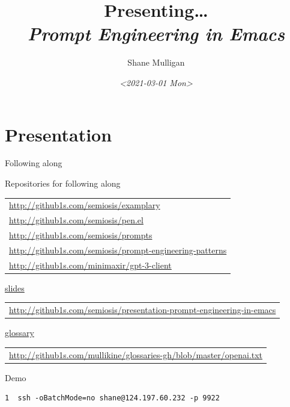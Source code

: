 \documentclass[presentation]{beamer}
\author{Shane Mulligan \\  }
\date{\textit{<2021-03-01 Mon>}}
\title{Presenting\ldots{} \\   \emph{\alert{Prompt Engineering in Emacs}} \\  }
\begin{document}
\maketitle

\section{Presentation}
\label{sec:org1c3bdad}
\begin{frame}[label={sec:org525837f},fragile]{Following along}
 \begin{block}{Repositories for following along}
{\footnotesize
\begin{center}
\begin{tabular}{l}
\url{http://github1s.com/semiosis/examplary}\\
\url{http://github1s.com/semiosis/pen.el}\\
\url{http://github1s.com/semiosis/prompts}\\
\url{http://github1s.com/semiosis/prompt-engineering-patterns}\\
\url{http://github1s.com/minimaxir/gpt-3-client}\\
\end{tabular}
\end{center}
}

{\tiny
\uline{\alert{slides}}
\begin{center}
\begin{tabular}{l}
\url{http://github1s.com/semiosis/presentation-prompt-engineering-in-emacs}\\
\end{tabular}
\end{center}
}

{\tiny
\uline{\alert{glossary}}
\begin{center}
\begin{tabular}{l}
\url{http://github1s.com/mullikine/glossaries-gh/blob/master/openai.txt}\\
\end{tabular}
\end{center}
}
\end{block}

\begin{block}{Demo}
{\footnotesize
\begin{verbatim}
1  ssh -oBatchMode=no shane@124.197.60.232 -p 9922
\end{verbatim}
}
\end{block}
\end{frame}
\end{document}
